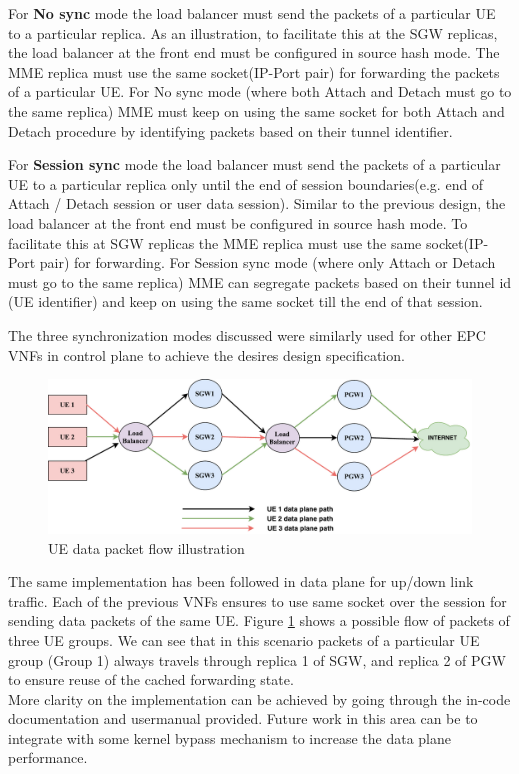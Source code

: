 \documentclass[hidelinks]{report}
\begin{document}
For \textbf{No sync} mode the load balancer must send the packets of a particular UE to a particular replica. As an illustration, to facilitate this at the SGW replicas, the load balancer at the front end must be configured in source hash mode. The MME replica must use the same socket(IP-Port pair) for forwarding the packets of a particular UE. For No sync mode (where both Attach and Detach must go to the same replica) MME must keep on using the same socket for both Attach and Detach procedure by identifying packets based on their tunnel identifier.

For \textbf{Session sync} mode the load balancer must send the packets of a particular UE to a particular replica only until the end of session boundaries(e.g. end of Attach / Detach session or user data session). Similar to the previous design, the load balancer at the front end must be configured in source hash mode. To facilitate this at SGW replicas  the MME replica must use the same socket(IP-Port pair) for forwarding. For Session sync mode (where only Attach or Detach must go to the same replica) MME can segregate packets based on their tunnel id (UE identifier) and keep on using the same socket till the end of that session.

The three synchronization modes discussed were similarly used for other EPC VNFs in control plane to achieve the desires design specification.

\begin{figure}[H]
\centering
\includegraphics[width = \linewidth]{images/datapath.pdf}
\caption{UE data packet flow illustration}
\label{fig:dpath}
\end{figure}
\par The same implementation has been followed  in data plane for up/down link traffic. Each of the previous VNFs ensures to use same socket over the session for sending data packets of the same UE. Figure \ref{fig:dpath} shows a possible flow of packets of three UE groups. We can see that in this scenario packets of a particular UE group (Group 1) always travels through replica 1 of SGW, and replica 2 of PGW to ensure reuse of the cached forwarding state.\\

More clarity on the implementation can be achieved by going through the in-code documentation and usermanual provided.
Future work in this area can be to integrate with some kernel bypass mechanism to increase the data plane performance.
\end{document}
